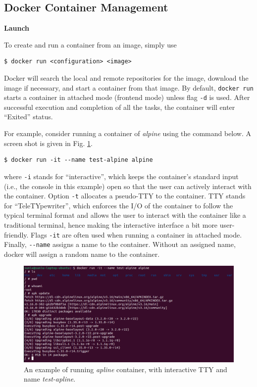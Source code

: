 \subsection{Docker Container Management}

\vspace{0.1in}
\noindent \textbf{Launch}
\vspace{0.1in}

To create and run a container from an image, simply use
\begin{lstlisting}
$ docker run <configuration> <image>
\end{lstlisting}
Docker will search the local and remote repositories for the image, download the image if necessary, and start a container from that image. By default, \verb|docker run| starts a container in attached mode (frontend mode) unless flag \verb|-d| is used. After successful execution and completion of all the tasks, the container will enter ``Exited'' status. 

For example, consider running a container of \textit{alpine} using the command below. A screen shot is given in Fig. \ref{ch:vac:fig:dockerrunexp}.
\begin{lstlisting}
$ docker run -it --name test-alpine alpine
\end{lstlisting}
where \verb|-i| stands for ``interactive'', which keeps the container's standard input (i.e., the console in this example) open so that the user can actively interact with the container. Option \verb|-t| allocates a pseudo-TTY to the container. TTY stands for ``TeleTYpewriter'', which enforces the I/O of the container to follow the typical terminal format and allows the user to interact with the container like a traditional terminal, hence making the interactive interface a bit more user-friendly. Flags \verb|-it| are often used when running a container in attached mode. Finally, \verb|--name| assigns a name to the container. Without an assigned name, docker will assign a random name to the container.
\begin{figure}[!htb]
	\centering
	\includegraphics[width=350pt]{chapters/part-3/figures/dockerrunexp.png}
	\caption{An example of running \textit{apline} container, with interactive TTY and name \textit{test-apline}.} \label{ch:vac:fig:dockerrunexp}
\end{figure}

